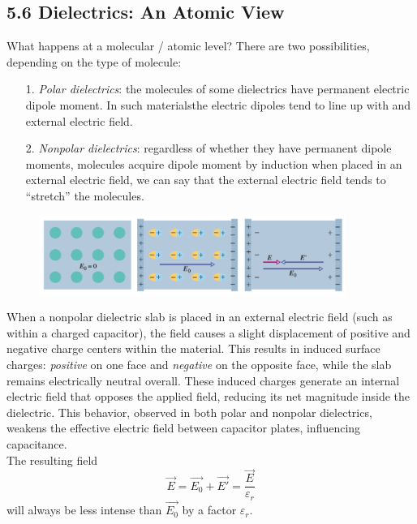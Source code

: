 \documentclass[12pt, a4paper]{article}
\begin{document}
		
		
		\subsection*{5.6 Dielectrics: An Atomic View}
		
		What happens at a molecular / atomic level? There are two possibilities, depending on the type of molecule:
		\begin{itemize}
			\item[1.]\textit{Polar dielectrics}: the molecules of some dielectrics have permanent electric dipole moment. In such materialsthe electric dipoles tend to line up with and external electric field.
			\item[2.]\textit{Nonpolar dielectrics}: regardless of whether they have permanent dipole moments, molecules acquire dipole moment by induction when placed in an external electric field, we can say that the external electric field tends to ``stretch'' the molecules.
		\end{itemize}
		
		\begin{figure}[!htbp]
			\centering
			\includegraphics[width=10cm]{Physics2_PNGs/molecular-dipoles.png}
			\caption*{}
			\label{fig:molecular-dipoles.png}
		\end{figure}	
		When a nonpolar dielectric slab is placed in an external electric field (such as within a charged capacitor), the field causes a slight displacement of positive and negative charge centers within the material. This results in induced surface charges: \textit{positive} on one face and \textit{negative} on the opposite face, while the slab remains electrically neutral overall. These induced charges generate an internal electric field that opposes the applied field, reducing its net magnitude inside the dielectric. This behavior, observed in both polar and nonpolar dielectrics, weakens the effective electric field between capacitor plates, influencing capacitance. \\
		The resulting field
		\[
			\vec{E} = \vec{E_0} + \vec{E'} = \frac{\vec{E}}{\varepsilon_r}
		\]
		will always be less intense than $\vec{E_0}$ by a factor $\varepsilon_r$.
		
\end{document}
